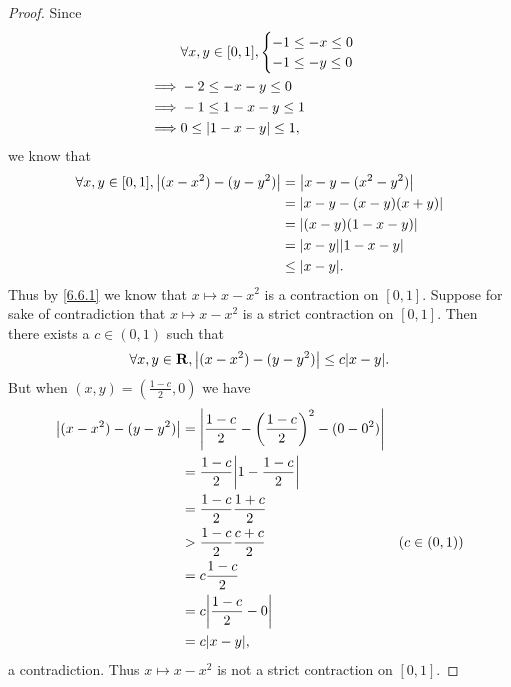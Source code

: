 \begin{proof}
  Since
  \begin{align*}
             & \forall x, y \in [0, 1], \begin{cases}
                                          -1 \leq -x \leq 0 \\
                                          -1 \leq -y \leq 0
                                        \end{cases} \\
    \implies & -2 \leq -x - y \leq 0                      \\
    \implies & -1 \leq 1 - x - y \leq 1                   \\
    \implies & 0 \leq \left\lvert1 - x - y\right\rvert \leq 1,
  \end{align*}
  we know that
  \begin{align*}
    \forall x, y \in [0, 1], \abs{(x - x^2) - (y - y^2)} & = \abs{x - y - (x^2 - y^2)}    \\
                                                         & = \abs{x - y - (x - y)(x + y)} \\
                                                         & = \abs{(x - y)(1 - x - y)}     \\
                                                         & = \abs{x - y} \abs{1 - x - y}  \\
                                                         & \leq \abs{x - y}.
  \end{align*}
  Thus by \cref{6.6.1} we know that \(x \mapsto x - x^2\) is a contraction on \([0, 1]\).
  Suppose for sake of contradiction that \(x \mapsto x - x^2\) is a strict contraction on \([0, 1]\).
  Then there exists a \(c \in (0, 1)\) such that
  \[
    \forall x, y \in \R, \abs{(x - x^2) - (y - y^2)} \leq c \abs{x - y}.
  \]
  But when \((x, y) = (\frac{1 - c}{2}, 0)\) we have
  \begin{align*}
    \abs{(x - x^2) - (y - y^2)} & = \abs{\frac{1 - c}{2} - \bigg(\frac{1 - c}{2}\bigg)^2 - (0 - 0^2)}                  \\
                                & = \frac{1 - c}{2} \abs{1 - \frac{1 - c}{2}}                                          \\
                                & = \frac{1 - c}{2} \frac{1 + c}{2}                                                    \\
                                & > \frac{1 - c}{2} \frac{c + c}{2}                                   & (c \in (0, 1)) \\
                                & = c \frac{1 - c}{2}                                                                  \\
                                & = c \abs{\frac{1 - c}{2} - 0}                                                        \\
                                & = c \abs{x - y},
  \end{align*}
  a contradiction.
  Thus \(x \mapsto x - x^2\) is not a strict contraction on \([0, 1]\).
\end{proof}


